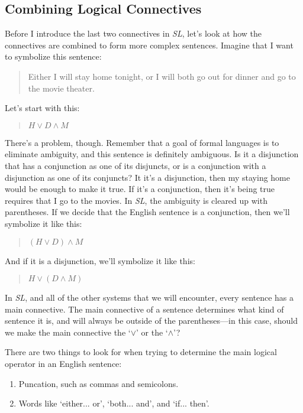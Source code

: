 \documentclass[../logic-text.tex]{subfiles}
\begin{document}
\subsection{Combining Logical Connectives}
\label{sec:comb-logic-conn}

Before I introduce the last two connectives in \emph{SL}, let's look at how the connectives are combined to form more complex sentences. Imagine that I want to symbolize this sentence:

\begin{quote}
  Either I will stay home tonight, or I will both go out for dinner and go to the movie theater.
\end{quote}

Let's start with this:

\begin{quote}
  \(H \lor D \land M\)
\end{quote}

There's a problem, though. Remember that a goal of formal languages is to eliminate ambiguity, and this sentence is definitely ambiguous. Is it a disjunction that has a conjunction as one of its disjuncts, or is a conjunction with a disjunction as one of its conjuncts? It it's a disjunction, then my staying home would be enough to make it true. If it's a conjunction, then it's being true requires that I go to the movies. In \emph{SL}, the ambiguity is cleared up with parentheses. If we decide that the English sentence is a conjunction, then we'll symbolize it like this:

\begin{quote}
  \((H \lor D) \land M\)
\end{quote}

\noindent And if it is a disjunction, we'll symbolize it like this:

\begin{quote}
    \(H \lor (D \land M)\)
\end{quote}

In \emph{SL}, and all of the other systems that we will encounter, every sentence has a main connective. The main connective of a sentence determines what kind of sentence it is, and will always be outside of the parentheses---in this case, should we make the main connective the \enquote*{\(\lor\)} or the \enquote*{\(\land\)}?

There are two things to look for when trying to determine the main logical operator in an English sentence:

\begin{enumerate}
  \item Puncation, such as commas and semicolons.
  \item Words like \enquote*{either... or}, \enquote*{both... and}, and \enquote*{if... then}.
\end{enumerate}
\end{document}
